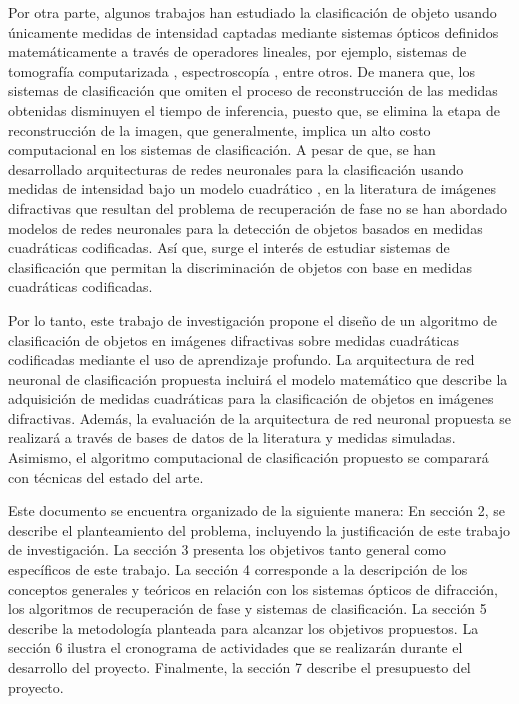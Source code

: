 Por otra parte, algunos trabajos han estudiado la clasificación de objeto usando únicamente medidas de intensidad captadas mediante sistemas ópticos definidos matemáticamente a través de operadores lineales, por ejemplo, sistemas de tomografía computarizada \cite{douarre2020value}, espectroscopía \cite{bacca2021deep}, entre otros. De manera que, los sistemas de clasificación que omiten el proceso de reconstrucción de las medidas obtenidas disminuyen el tiempo de inferencia, puesto que, se elimina la etapa de reconstrucción de la imagen, que generalmente, implica un alto costo computacional en los sistemas de clasificación. A pesar de que, se han desarrollado arquitecturas de redes neuronales para la clasificación usando medidas de intensidad bajo un modelo cuadrático \cite{kim2018deep, ziletti2018insightful}, en la literatura de imágenes difractivas que resultan del problema de recuperación de fase no se han abordado modelos de redes neuronales para la detección de objetos basados en medidas cuadráticas codificadas. Así que, surge el interés de estudiar sistemas de clasificación que permitan la discriminación de objetos con base en medidas cuadráticas codificadas.

Por lo tanto, este trabajo de investigación propone el diseño de un algoritmo de clasificación de objetos en imágenes difractivas sobre medidas cuadráticas codificadas mediante el uso de aprendizaje profundo. La arquitectura de red neuronal de clasificación propuesta incluirá el modelo matemático que describe la adquisición de medidas cuadráticas para la clasificación de objetos en imágenes difractivas. Además, la evaluación de la arquitectura de red neuronal propuesta se realizará a través de bases de datos de la literatura y medidas simuladas. Asimismo, el algoritmo computacional de clasificación propuesto se comparará con técnicas del estado del arte.


Este documento se encuentra organizado de la siguiente manera: En sección 2, se describe el planteamiento del problema, incluyendo la justificación de este trabajo de investigación. La sección 3 presenta los objetivos tanto general como específicos de este trabajo. La sección 4 corresponde a la descripción de los conceptos generales y teóricos en relación con los sistemas ópticos de difracción, los algoritmos de recuperación de fase y sistemas de clasificación. La sección 5 describe la metodología planteada para alcanzar los objetivos propuestos. La sección 6 ilustra el cronograma de actividades que se realizarán durante el desarrollo del proyecto. Finalmente, la sección 7 describe el presupuesto del proyecto. 


\pagebreak